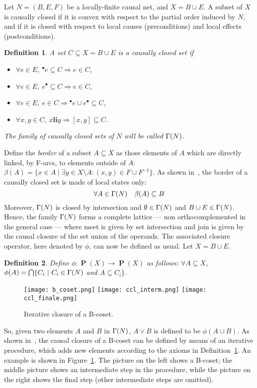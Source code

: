 \documentclass{eptcs}
\newcommand{\pws}{\mathop{\mathbf{P}}\nolimits}          \newcommand{\preco}[1]{\mbox{${}^\bullet{#1}$}} \newcommand{\postc}[1]{\mbox{${#1}^\bullet$}}   \newcommand{\li}{\mathrel{\mathbf{li}}}
\newtheorem{definition}{Definition}
\begin{document}
Let $N = (B, E, F)$ be a locally-finite causal net,
and $X = B \cup E$.
A subset of $X$ is causally closed if it is convex with respect to the
partial order induced by $N$, and if it is closed with respect
to local causes (preconditions) and local effects (postconditions).
\begin{definition} \label{d:sottoinsiemi_causalmente_chiusi}
A set $C \subseteq X = B \cup E$ is a \emph{causally closed set} if
\begin{itemize}
\item [\emph{(i)}] $\forall e \in E$, $\preco e \subseteq C \Rightarrow
e \in C$,
\item [\emph{(ii)}] $\forall e \in E$, $\postc e \subseteq C \Rightarrow
e \in C$,
\item [\emph{(iii)}] $\forall e \in E$, $e \in C \Rightarrow
\preco e  \cup \postc e \subseteq C$,
\item [\emph{(iv)}] $\forall x,y \in C$, $x \li y \Rightarrow
[x,y] \subseteq C$.
\end{itemize}
The family of causally closed sets of $N$ will be called $\Gamma(N)$.
\end{definition}
Define the \emph{border} of a subset $A \subseteq X$ as those
elements of $A$ which are directly linked, by F-arcs, to elements outside
of $A$:
$\beta(A) = \{ x \in A \mid
    \exists y \in X\setminus A: (x,y) \in F \cup F^{-1} \}$.
As shown in~\cite{BPR10}, the border of a causally closed set is
made of local states only:
\[
  \forall A \in \Gamma(N)\quad \beta(A) \subseteq B
\]
Moreover, $\Gamma(N)$ is closed by
intersection and $\emptyset \in \Gamma(N)$ and $B \cup E \in
\Gamma(N)$.
Hence, the family $\Gamma(N)$  forms a complete lattice --- non
orthocomplemented in the general case --- where meet is given by set
intersection and join is given by the causal closure of
the set union of the operands.
The associated closure operator, here denoted by $\phi$,
can now be defined as usual.
Let $X = B \cup E$.
\begin{definition}\label{d:costruzione_sottoinsiemi_causalmente_chiusi}
Define $\phi: \pws(X) \rightarrow \pws(X)$ as follows:
$\forall A \subseteq X$,
$\phi(A)=\bigcap \{C_i \ | \ C_i \in \Gamma(N)$ and $A \subseteq C_i\}$.
\end{definition}
\begin{figure}
  \begin{center}
\texttt{[image: b\_coset.png]}
\quad
\texttt{[image: ccl\_interm.png]}
\quad
\texttt{[image: ccl\_finale.png]}
  \end{center}
  \caption{Iterative closure of a B-coset.}\label{f:it_clos}
\end{figure}
So, given two elements $A$ and $B$ in $\Gamma(N)$, $A\vee B$ is defined
to be $\phi(A\cup B)$.
As shown in~\cite{BPR10}, the causal closure of a B-coset can be
defined by means of an iterative procedure, which adds new
elements according to the axioms in
Definition~\ref{d:sottoinsiemi_causalmente_chiusi}.
An example is shown in Figure~\ref{f:it_clos}.
The picture on the left shows a B-coset; the middle picture
shows an intermediate step in the procedure, while the picture
on the right shows the final step (other intermediate steps
are omitted).
\end{document}
